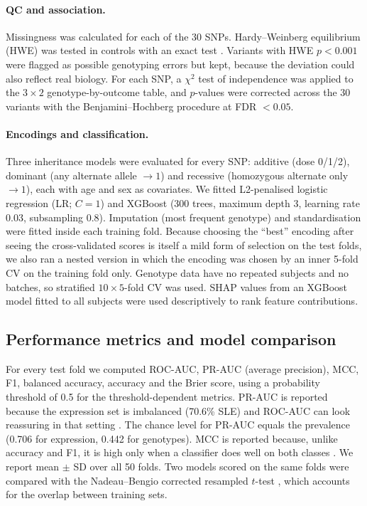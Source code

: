 \documentclass[11pt]{article}
\begin{document}
\paragraph{QC and association.} Missingness was calculated for each of the 30 SNPs. Hardy--Weinberg equilibrium (HWE) was tested in controls with an exact test \citep{wigginton2005}. Variants with HWE $p < 0.001$ were flagged as possible genotyping errors but kept, because the deviation could also reflect real biology. For each SNP, a $\chi^2$ test of independence was applied to the $3 \times 2$ genotype-by-outcome table, and $p$-values were corrected across the 30 variants with the Benjamini--Hochberg procedure \citep{bh1995} at FDR $< 0.05$.

\paragraph{Encodings and classification.} Three inheritance models were evaluated for every SNP: additive (dose 0/1/2), dominant (any alternate allele $\rightarrow 1$) and recessive (homozygous alternate only $\rightarrow 1$), each with age and sex as covariates. We fitted L2-penalised logistic regression (LR; $C = 1$) and XGBoost \citep{chen2016xgb} (300 trees, maximum depth 3, learning rate 0.03, subsampling 0.8). Imputation (most frequent genotype) and standardisation were fitted inside each training fold. Because choosing the ``best'' encoding after seeing the cross-validated scores is itself a mild form of selection on the test folds, we also ran a nested version in which the encoding was chosen by an inner 5-fold CV on the training fold only. Genotype data have no repeated subjects and no batches, so stratified $10\times5$-fold CV was used. SHAP values \citep{lundberg2017} from an XGBoost model fitted to all subjects were used descriptively to rank feature contributions.

\subsection{Performance metrics and model comparison}

For every test fold we computed ROC-AUC, PR-AUC (average precision), MCC, F1, balanced accuracy, accuracy and the Brier score, using a probability threshold of 0.5 for the threshold-dependent metrics. PR-AUC is reported because the expression set is imbalanced (70.6\% SLE) and ROC-AUC can look reassuring in that setting \citep{saito2015}. The chance level for PR-AUC equals the prevalence (0.706 for expression, 0.442 for genotypes). MCC is reported because, unlike accuracy and F1, it is high only when a classifier does well on both classes \citep{chicco2020}. We report mean $\pm$ SD over all 50 folds. Two models scored on the same folds were compared with the Nadeau--Bengio corrected resampled $t$-test \citep{nadeau2003}, which accounts for the overlap between training sets.
\end{document}
